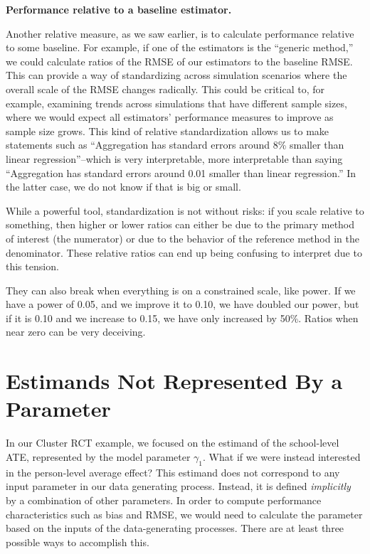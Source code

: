 \documentclass[
]{book}
\begin{document}
\textbf{Performance relative to a baseline estimator.}

Another relative measure, as we saw earlier, is to calculate performance relative to some baseline.
For example, if one of the estimators is the ``generic method,'' we could calculate ratios of the RMSE of our estimators to the baseline RMSE.
This can provide a way of standardizing across simulation scenarios where the overall scale of the RMSE changes radically.
This could be critical to, for example, examining trends across simulations that have different sample sizes, where we would expect all estimators' performance measures to improve as sample size grows.
This kind of relative standardization allows us to make statements such as ``Aggregation has standard errors around 8\% smaller than linear regression''--which is very interpretable, more interpretable than saying ``Aggregation has standard errors around 0.01 smaller than linear regression.''
In the latter case, we do not know if that is big or small.

While a powerful tool, standardization is not without risks: if you scale relative to something, then higher or lower ratios can either be due to the primary method of interest (the numerator) or due to the behavior of the reference method in the denominator.
These relative ratios can end up being confusing to interpret due to this tension.

They can also break when everything is on a constrained scale, like power.
If we have a power of 0.05, and we improve it to 0.10, we have doubled our power, but if it is 0.10 and we increase to 0.15, we have only increased by 50\%.
Ratios when near zero can be very deceiving.

\section{Estimands Not Represented By a Parameter}\label{implicit-estimands}

In our Cluster RCT example, we focused on the estimand of the school-level ATE, represented by the model parameter \(\gamma_1\).
What if we were instead interested in the person-level average effect?
This estimand does not correspond to any input parameter in our data generating process.
Instead, it is defined \emph{implicitly} by a combination of other parameters.
In order to compute performance characteristics such as bias and RMSE, we would need to calculate the parameter based on the inputs of the data-generating processes.
There are at least three possible ways to accomplish this.
\end{document}
